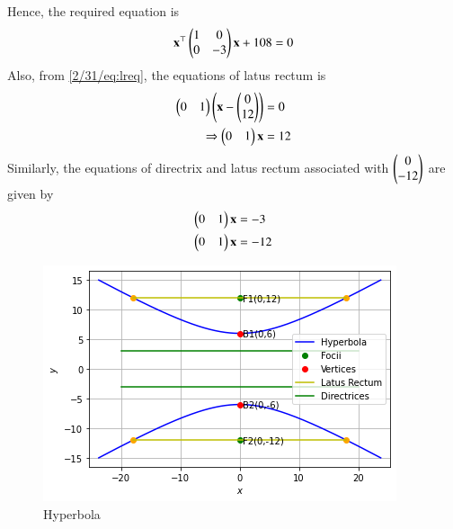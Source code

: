 Hence, the required equation is
\begin{align}
    \mathbf{x}^{\top}\begin{pmatrix}1&0\\0&-3\end{pmatrix}\mathbf{x}+108=0
\end{align}
Also, from \eqref{2/31/eq:lreq}, the equations of latus rectum is
\begin{align}
    \begin{pmatrix}0&1\end{pmatrix}\left(\mathbf{x}-\begin{pmatrix}0\\12\end{pmatrix}\right) &= 0\\
    \Rightarrow \begin{pmatrix}0&1\end{pmatrix}\mathbf{x} &= 12
\end{align}
Similarly, the equations of directrix and latus rectum associated with $\begin{pmatrix}0\\ -12\end{pmatrix}$ are given by
\begin{align}
    \begin{pmatrix}0&1\end{pmatrix}\mathbf{x} &= -3\\
    \begin{pmatrix}0&1\end{pmatrix}\mathbf{x} &= -12
\end{align}
\begin{figure}[!h]
 \centering
 \includegraphics[width=\columnwidth]{solutions/oct/2/31/figures/Assignment5.png}
 \caption{Hyperbola}
 \label{2/31/plot}
\end{figure}
